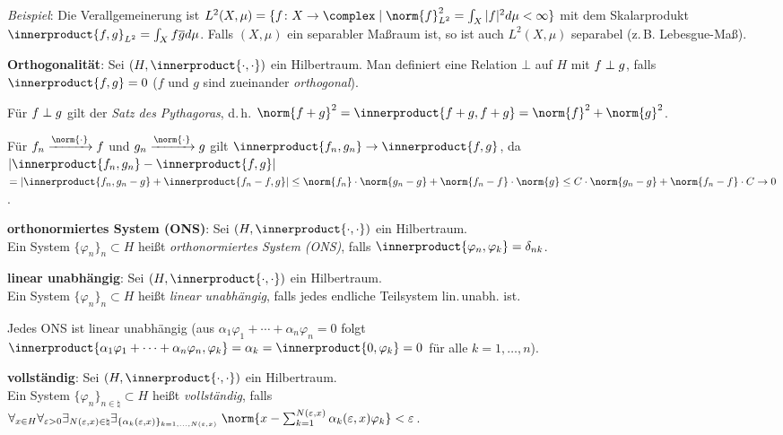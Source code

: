 \emph{Beispiel}:
Die Verallgemeinerung ist $L^2(X, \mu) =
\{f\colon X \rightarrow \complex \;|\;
\norm{f}_{L^2}^2 = \int_X |f|^2 d\mu < \infty\}$ mit dem Skalarprodukt
$\innerproduct{f, g}_{L^2} = \int_X f \overline{g} d\mu$.
Falls $(X, \mu)$ ein separabler Maßraum ist, so ist auch
$L^2(X, \mu)$ separabel (z.\,B. Lebesgue-Maß).

\linie

\textbf{Orthogonalität}:
Sei $(H, \innerproduct{\cdot, \cdot})$ ein Hilbertraum.
Man definiert eine Relation $\bot$ auf $H$ mit
$f \;\bot\; g$, falls $\innerproduct{f, g} = 0$
($f$ und $g$ sind zueinander \emph{orthogonal}).

Für $f \;\bot\; g$ gilt der \emph{Satz des Pythagoras}, d.\,h.
$\norm{f + g}^2 = \innerproduct{f + g, f + g} = \norm{f}^2 + \norm{g}^2$.

Für $f_n \xrightarrow{\norm{\cdot}} f$ und $g_n \xrightarrow{\norm{\cdot}} g$
gilt $\innerproduct{f_n, g_n} \to \innerproduct{f, g}$, da
$|\innerproduct{f_n, g_n} - \innerproduct{f, g}|$\\
$= |\innerproduct{f_n, g_n - g} + \innerproduct{f_n - f, g}| \le
\norm{f_n} \cdot \norm{g_n - g} + \norm{f_n - f} \cdot \norm{g}
\le C \cdot \norm{g_n - g} + \norm{f_n - f} \cdot C \to 0$.

\linie

\textbf{orthonormiertes System (ONS)}:
Sei $(H, \innerproduct{\cdot, \cdot})$ ein Hilbertraum.\\
Ein System $\{\varphi_n\}_n \subset H$ heißt
\emph{orthonormiertes System (ONS)}, falls
$\innerproduct{\varphi_n, \varphi_k} = \delta_{nk}$.

\textbf{linear unabhängig}:
Sei $(H, \innerproduct{\cdot, \cdot})$ ein Hilbertraum.\\
Ein System $\{\varphi_n\}_n \subset H$ heißt
\emph{linear unabhängig}, falls jedes endliche Teilsystem lin.\,unabh. ist.

Jedes ONS ist linear unabhängig
(aus $\alpha_1 \varphi_1 + \dotsb + \alpha_n \varphi_n = 0$ folgt\\
$\innerproduct{\alpha_1 \varphi_1 + \dotsb + \alpha_n \varphi_n, \varphi_k}
= \alpha_k = \innerproduct{0, \varphi_k} = 0$ für alle $k = 1, \dotsc, n$).

\textbf{vollständig}:
Sei $(H, \innerproduct{\cdot, \cdot})$ ein Hilbertraum.\\
Ein System $\{\varphi_n\}_{n \in \natural} \subset H$ heißt
\emph{vollständig}, falls\\
$\forall_{x \in H} \forall_{\varepsilon > 0}
\exists_{N(\varepsilon, x) \in \natural}
\exists_{\{\alpha_k(\varepsilon, x)\}_{k=1,\dotsc,N(\varepsilon,x)}}\;
\norm{x - \sum_{k=1}^{N(\varepsilon,x)} \alpha_k(\varepsilon, x) \varphi_k}
< \varepsilon$.

